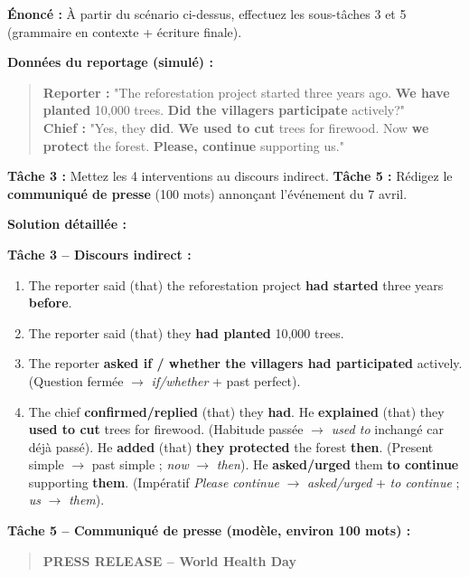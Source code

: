 \documentclass[11pt]{article}
\begin{document}
\begin{exoresolu}
\textbf{Énoncé :} À partir du scénario ci-dessus, effectuez les sous-tâches 3 et 5 (grammaire en contexte + écriture finale).

\textbf{Données du reportage (simulé) :}
\begin{quote}
\textbf{Reporter :} "The reforestation project started three years ago. \textbf{We have planted} 10,000 trees. \textbf{Did the villagers participate} actively?" \\
\textbf{Chief :} "Yes, they \textbf{did}. \textbf{We used to cut} trees for firewood. Now \textbf{we protect} the forest. \textbf{Please, continue} supporting us."
\end{quote}

\textbf{Tâche 3 :} Mettez les 4 interventions au discours indirect.
\textbf{Tâche 5 :} Rédigez le \textbf{communiqué de presse} (100 mots) annonçant l'événement du 7 avril.

\tcblower
\textbf{Solution détaillée :}

\textbf{Tâche 3 -- Discours indirect :}
\begin{enumerate}
    \item The reporter said (that) the reforestation project \textbf{had started} three years \textbf{before}.
    \item The reporter said (that) they \textbf{had planted} 10,000 trees.
    \item The reporter \textbf{asked if / whether the villagers had participated} actively. (Question fermée $\rightarrow$ \emph{if/whether} + past perfect).
    \item The chief \textbf{confirmed/replied} (that) they \textbf{had}. He \textbf{explained} (that) they \textbf{used to cut} trees for firewood. (Habitude passée $\rightarrow$ \emph{used to} inchangé car déjà passé). He \textbf{added} (that) \textbf{they protected} the forest \textbf{then}. (Present simple $\rightarrow$ past simple ; \emph{now} $\rightarrow$ \emph{then}). He \textbf{asked/urged} them \textbf{to continue} supporting \textbf{them}. (Impératif \emph{Please continue} $\rightarrow$ \emph{asked/urged} + \emph{to continue} ; \emph{us} $\rightarrow$ \emph{them}).
\end{enumerate}

\textbf{Tâche 5 -- Communiqué de presse (modèle, environ 100 mots) :}

\begin{quote}
\textbf{PRESS RELEASE -- World Health Day}


\end{quote}
\end{exoresolu}
\end{document}
